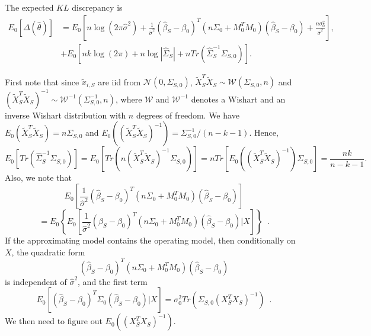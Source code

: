 \documentclass[11pt]{article}
\begin{document}
{The expected $KL$ discrepancy is
\begin{equation}
\begin{aligned}
E_0 [\Delta (\hat \theta)] &=  E_0 \left [ n\log (2\pi \hat \sigma^2) + \frac{1}{\hat \sigma^2}  (\hat \beta_S-\beta_0)^T (n\Sigma_0+M_0^T M_0) (\hat \beta_S-\beta_0) + \frac{n\sigma_0^2}{\hat \sigma^2} \right ], \\
&+E_0 \left [nk \log(2\pi) + n\log |\hat \Sigma_S| + n Tr(\hat \Sigma_S^{-1}\Sigma_{S,0}) \right ].
\end{aligned}
\label{eq:ekl}
\end{equation}

First note that since $\tilde{x}_{i,S}$ are iid from $\mathcal{N}(0,\Sigma_{S,0})$, $\tilde{X}_S^T \tilde{X}_S \sim \mathcal{W}(\Sigma_{S,0}, n)$ and $ (\tilde{X}_S^T \tilde{X}_S)^{-1} \sim \mathcal{W}^{-1} (\Sigma_{S,0}^{-1}, n)$, where $\mathcal{W}$ and $\mathcal{W}^{-1}$ denotes a Wishart and an inverse Wishart distribution with $n$ degrees of freedom. We have $E_0(\tilde{X}_S^T \tilde{X}_S) = n\Sigma_{S,0}$ and $E_0 ((\tilde{X}_S^T \tilde{X}_S)^{-1}) = \Sigma_{S,0}^{-1} / (n-k-1)$. Hence,
$$
  E_0 \left[ Tr(\hat \Sigma_S^{-1}\Sigma_{S,0}) \right] = E_0 \left[ Tr(n (\tilde{X}_S^T \tilde{X}_S)^{-1} \Sigma_{S,0}) \right] = n Tr\left[ E_0\left( (\tilde{X}_S^T \tilde{X}_S)^{-1} \right) \Sigma_{S,0}\right] = \frac{nk}{n-k-1}.
$$
Also, we note that
\[
E_0 \left [ \frac{1}{\hat \sigma^2}  (\hat \beta_S-\beta_0)^T (n\Sigma_0+M_0^T M_0) (\hat \beta_S-\beta_0) \right ]
\]
\[
= E_0 \left \{ E_0 \left [ \frac{1}{\hat \sigma^2}  (\hat \beta_S-\beta_0)^T (n\Sigma_0+M_0^T M_0) (\hat \beta_S-\beta_0) |X \right ] \right \} \,\,\, .
\]
If the approximating model contains the operating model, then conditionally on $X$, the quadratic form
\[
(\hat \beta_S-\beta_0)^T (n\Sigma_0+M_0^T M_0) (\hat \beta_S-\beta_0)
\]
is independent of $\hat \sigma^2$, and the first term
\[
E_0 \left [ (\hat \beta_S-\beta_0)^T \Sigma_0 (\hat \beta_S-\beta_0) |X \right ] = \sigma_0^2 Tr(\Sigma_{S,0} (X_S^TX_S)^{-1} )  \,\,\, .
\]
We then need to figure out $E_0((X_S^TX_S)^{-1})$.

\clearpage

}
\end{document}
